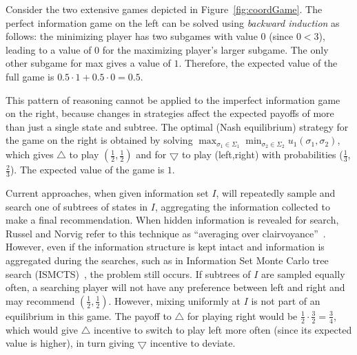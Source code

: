 \documentclass{aamas2015}
\begin{document}

Consider the two extensive games depicted in Figure~\ref{fig:coordGame}. The perfect information game on the left can be solved using {\it backward induction}
as follows: the minimizing player has two subgames with value 0 (since $0 < 3$), leading to a value of 0 for the maximizing player's larger subgame. The only other subgame for max gives a value of $1$. Therefore, the expected value of the full game is $0.5 \cdot 1 + 0.5 \cdot 0 = 0.5$.

This pattern of reasoning cannot be applied to the imperfect information game on the right, because changes in strategies affect the expected payoffs of more 
than just a single state and subtree.
The optimal (Nash equilibrium) strategy for the game on the right is obtained by solving $\max_{\sigma_1 \in \Sigma_1} \min_{\sigma_2 \in \Sigma_2} u_1(\sigma_1, \sigma_2)$, which gives $\bigtriangleup$ to play $(\frac{1}{2},\frac{1}{2})$ and for $\bigtriangledown$ to play (left,right) with probabilities ($\frac{1}{3}$,$\frac{2}{3}$). The expected value of the game is $1$.

Current approaches, when given information set $I$, will repeatedly sample and search one of subtrees of states in $I$, aggregating the information collected to make a final recommendation. When hidden information is revealed for search, Russel and Norvig refer to this technique as ``averaging over clairvoyance''~\cite{russellnorvig}. However, even if the information structure is kept intact and information is aggregated during the searches, such as in Information Set Monte Carlo tree search (ISMCTS)~\cite{Cowling12ISMCTS}, the problem still occurs. If subtrees of $I$ are sampled equally often, a searching player will not have any preference between left and right and may recommend $(\frac{1}{2},\frac{1}{2})$. However, mixing uniformly at $I$ is not part of an equilibrium in this game. The payoff to $\bigtriangleup$ for playing right would be $\frac{1}{2} \cdot \frac{3}{2} = \frac{3}{4}$, which would give $\bigtriangleup$ incentive to switch to play left more often (since its expected value is higher), in turn giving $\bigtriangledown$ incentive to deviate. 
\end{document}
